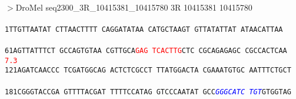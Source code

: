 \documentclass[11pt,twoside,reqno,a4paper]{article}
\begin{document}
\\
$>$DroMel	seq2300\_3R\_10415381\_10415780	3R	10415381	10415780 \\
 \\
\texttt{1\hspace*{3\charwidth}TTGTTAATAT	CTTAACTTTT	CAGGATATAA	CATGCTAAGT	GTTATATTAT	ATAACATTAA	\\
\hspace*{4\charwidth}\hspace*{1\charwidth}\hspace*{1\charwidth}\hspace*{1\charwidth}\hspace*{1\charwidth}\hspace*{1\charwidth}\hspace*{1\charwidth}\\
61\hspace*{2\charwidth}AGTTATTTCT	GCCAGTGTAA	CGTTGCA\textcolor{Red}{G}\textcolor{Red}{A}\textcolor{Red}{G}	\textcolor{Red}{T}\textcolor{Red}{C}\textcolor{Red}{A}\textcolor{Red}{C}\textcolor{Red}{T}\textcolor{Red}{T}\textcolor{Red}{G}CTC	CGCAGAGAGC	CGCCACTCAA	\\
\hspace*{4\charwidth}\hspace*{1\charwidth}\hspace*{1\charwidth}\hspace*{27\charwidth}\textcolor{Red}{7.3}\hspace*{1\charwidth}\hspace*{1\charwidth}\hspace*{1\charwidth}\hspace*{1\charwidth}\\
121\hspace*{1\charwidth}AGATCAACCC	TCGATGGCAG	ACTCTCGCCT	TTATGGACTA	CGAAATGTGC	AATTTCTGCT	\\
\hspace*{4\charwidth}\hspace*{1\charwidth}\hspace*{1\charwidth}\hspace*{1\charwidth}\hspace*{1\charwidth}\hspace*{1\charwidth}\hspace*{1\charwidth}\\
181\hspace*{1\charwidth}CGGGTACCGA	GTTTTACGAT	TTTTCCATAG	GTCCCAATAT	GCC\textit{\textcolor{Blue}{G}}\textit{\textcolor{Blue}{G}}\textit{\textcolor{Blue}{G}}\textit{\textcolor{Blue}{C}}\textit{\textcolor{Blue}{A}}\textit{\textcolor{Blue}{T}}\textit{\textcolor{Blue}{C}}	\textit{\textcolor{Blue}{T}}\textit{\textcolor{Blue}{G}}\textit{\textcolor{Blue}{T}}GTGGTAG	\\
}
\end{document}
